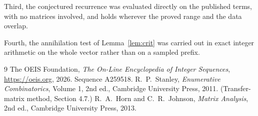 \documentclass[11pt,a4paper]{article}
\theoremstyle{plain}
\theoremstyle{definition}
\begin{document}
Third, the conjectured recurrence was evaluated directly on the published terms, with no
matrices involved, and holds wherever the proved range and the data overlap.

Fourth, the annihilation test of Lemma~\ref{lem:crit} was carried out in exact integer
arithmetic on the whole vector rather than on a sampled prefix.

\begin{thebibliography}{9}
 The OEIS Foundation, \emph{The On-Line Encyclopedia of Integer
Sequences}, \url{https://oeis.org}, 2026. Sequence A259518.
 R.~P.~Stanley, \emph{Enumerative Combinatorics}, Volume 1, 2nd ed.,
Cambridge University Press, 2011. (Transfer-matrix method, Section 4.7.)
 R.~A.~Horn and C.~R.~Johnson, \emph{Matrix Analysis}, 2nd ed., Cambridge
University Press, 2013.
\end{thebibliography}
\end{document}
